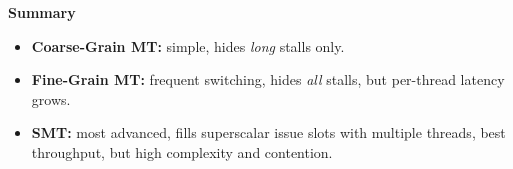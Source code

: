 \vspace{-1em}

\begin{flushleft}
    \textcolor{Green3}{ \textbf{Summary}}
\end{flushleft}
\begin{itemize}
    \item \textbf{Coarse-Grain MT:} simple, hides \emph{long} stalls only.
    \item \textbf{Fine-Grain MT:} frequent switching, hides \emph{all} stalls, but per-thread latency grows.
    \item \textbf{SMT:} most advanced, fills superscalar issue slots with multiple threads, best throughput, but high complexity and contention.
\end{itemize}